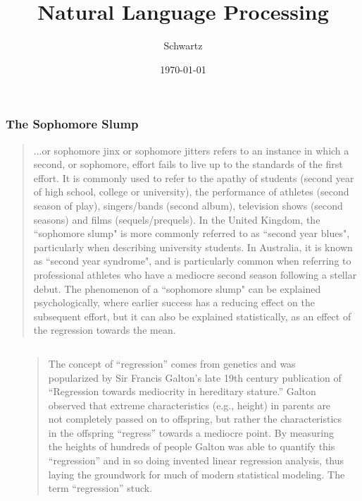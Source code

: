 \documentclass[xcolor={dvipsnames}]{beamer}
\title{Natural Language Processing}
\author{Schwartz}
\date{\today}
\begin{document}
\frame{\titlepage}

\frame
{
 \frametitle{The Sophomore Slump}

{
\selectfont
\begin{quote}
\tiny
\justify

...or sophomore jinx or sophomore jitters refers to an instance in which a second, or sophomore, effort fails to live up to the standards of the first effort. It is commonly used to refer to the apathy of students (second year of high school, college or university), the performance of athletes (second season of play), singers/bands (second album), television shows (second seasons) and films (sequels/prequels). In the United Kingdom, the ``sophomore slump" is more commonly referred to as ``second year blues", particularly when describing university students. In Australia, it is known as ``second year syndrome", and is particularly common when referring to professional athletes who have a mediocre second season following a stellar debut. The phenomenon of a ``sophomore slump" can be explained psychologically, where earlier success has a reducing effect on the subsequent effort, but it can also be explained statistically, as an effect of the regression towards the mean.

\end{quote}
}

\begin{columns}
\begin{column}{.011\textwidth}
\end{column}
\begin{column}{.6\textwidth}
{
\selectfont
\begin{quote}
\tiny
\justify

The concept of ``regression'' comes from genetics and was popularized by Sir Francis Galton's late 19th century publication of ``Regression towards mediocrity in hereditary stature.'' Galton observed that extreme characteristics (e.g., height) in parents are not completely passed on to offspring, but rather the characteristics in the offspring ``regress'' towards a mediocre point. By measuring the heights of hundreds of people Galton was able to quantify this ``regression'' and in so doing invented linear regression analysis, thus laying the groundwork for much of modern statistical modeling. The term ``regression'' stuck.
\end{quote}
}
\end{column}
\begin{column}{.4\textwidth}
\vspace{.1in}

\end{column}
\end{columns}


}
\end{document}
